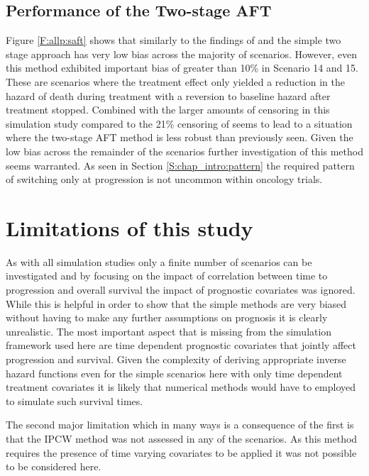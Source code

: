 \subsection{Performance of the Two-stage AFT}

Figure \ref{F:allp:saft} shows that similarly to the findings of \cite{Latimer2013} and \cite{Latimer2016} the simple two stage approach has very low bias across the majority of scenarios. However, even this method exhibited important bias of greater than 10\% in Scenario 14 and 15. These are scenarios where the treatment effect only yielded a reduction in the hazard of death during treatment with a reversion to baseline hazard after treatment stopped. Combined with the larger amounts of censoring in this simulation study compared to the 21\% censoring of \cite{Latimer2013} seems to lead to a situation where the two-stage AFT method is less robust than previously seen. Given the low bias across the remainder of the scenarios further investigation of this method seems warranted. As seen in Section \ref{S:chap_intro:pattern} the required pattern of switching only at progression is not uncommon within oncology trials.

\section{Limitations of this study}

As with all simulation studies only a finite number of scenarios can be investigated and by focusing on the impact of correlation between time to progression and overall survival the impact of prognostic covariates was ignored. While this is helpful in order to show that the simple methods are very biased without having to make any further assumptions on prognosis it is clearly unrealistic. The most important aspect that is missing from the simulation framework used here are time dependent prognostic covariates that jointly affect progression and survival. Given the complexity of deriving appropriate inverse hazard functions even for the simple scenarios here with only time dependent treatment covariates it is likely that numerical methods would have to employed to simulate such survival times. 

The second major limitation which in many ways is a consequence of the first is that the IPCW method was not assessed in any of the scenarios. As this method requires the presence of time varying covariates to be applied it was not possible to be considered here. 

